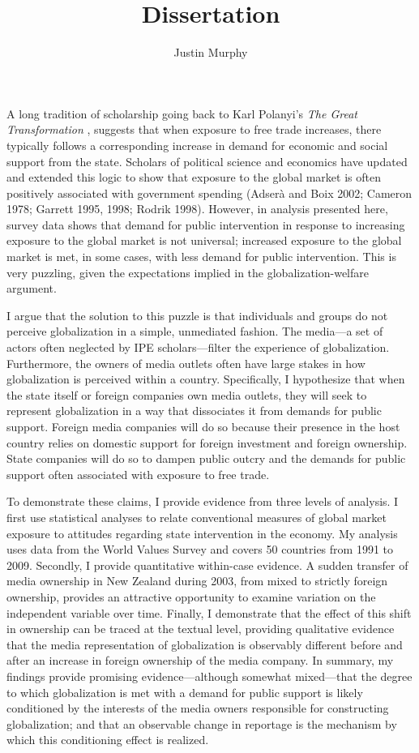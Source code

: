 \documentclass[12pt]{report}
\begin{document}
\title{Dissertation}
\author{Justin Murphy}


\maketitle

A long tradition of scholarship going back to Karl Polanyi's \emph{The Great Transformation} \citep{Polanyi:2001vc}, suggests that when exposure to free trade increases, there typically follows a corresponding increase in demand for economic and social support from the state. Scholars of political science and economics have updated and extended this logic to show that exposure to the global market is often positively associated with government spending \citep{Adsera:2002vt} (Adserà and Boix 2002; Cameron 1978; Garrett 1995, 1998; Rodrik 1998). However, in analysis presented here, survey data shows that demand for public intervention in response to increasing exposure to the global market is not universal; increased exposure to the global market is met, in some cases, with less demand for public intervention. This is very puzzling, given the expectations implied in the globalization-welfare argument.

	I argue that the solution to this puzzle is that individuals and groups do not perceive globalization in a simple, unmediated fashion. The media---a set of actors often neglected by IPE scholars---filter the experience of globalization. Furthermore, the owners of media outlets often have large stakes in how globalization is perceived within a country. Specifically, I hypothesize that when the state itself or foreign companies own media outlets, they will seek to represent globalization in a way that dissociates it from demands for public support. Foreign media companies will do so because their presence in the host country relies on domestic support for foreign investment and foreign ownership. State companies will do so to dampen public outcry and the demands for public support often associated with exposure to free trade.

	To demonstrate these claims, I provide evidence from three levels of analysis. I first use statistical analyses to relate conventional measures of global market exposure to attitudes regarding state intervention in the economy. My analysis uses data from the World Values Survey and covers 50 countries from 1991 to 2009. Secondly, I provide quantitative within-case evidence. A sudden transfer of media ownership in New Zealand during 2003, from mixed to strictly foreign ownership, provides an attractive opportunity to examine variation on the independent variable over time. Finally, I demonstrate that the effect of this shift in ownership can be traced at the textual level, providing qualitative evidence that the media representation of globalization is observably different before and after an increase in foreign ownership of the media company. In summary, my findings provide promising evidence---although somewhat mixed---that the degree to which globalization is met with a demand for public support is likely conditioned by the interests of the media owners responsible for constructing globalization; and that an observable change in reportage is the mechanism by which this conditioning effect is realized.
\end{document}
